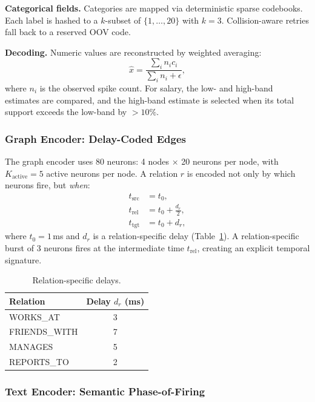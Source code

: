 \textbf{Categorical fields.} Categories are mapped via deterministic sparse codebooks. Each label is hashed to a $k$-subset of $\{1,\dots,20\}$ with $k=3$. Collision-aware retries fall back to a reserved OOV code.

\textbf{Decoding.} Numeric values are reconstructed by weighted averaging:
\begin{equation}
\hat{x} = \frac{\sum_i n_i c_i}{\sum_i n_i + \epsilon},
\end{equation}
where $n_i$ is the observed spike count. For salary, the low- and high-band estimates are compared, and the high-band estimate is selected when its total support exceeds the low-band by $>10\%$.

\subsubsection{Graph Encoder: Delay-Coded Edges}

The graph encoder uses 80 neurons: 4 nodes $\times$ 20 neurons per node, with $K_{\mathrm{active}}=5$ active neurons per node. A relation $r$ is encoded not only by which neurons fire, but \textit{when}:
\begin{align}
t_{\mathrm{src}} &= t_0, \\
t_{\mathrm{rel}} &= t_0 + \frac{d_r}{2}, \\
t_{\mathrm{tgt}} &= t_0 + d_r,
\end{align}
where $t_0 = 1$\,ms and $d_r$ is a relation-specific delay (Table~\ref{tab:delays}). A relation-specific burst of 3 neurons fires at the intermediate time $t_{\mathrm{rel}}$, creating an explicit temporal signature.

\begin{table}[h]
\centering
\caption{Relation-specific delays.}
\label{tab:delays}
\begin{tabular}{@{}lc@{}}
\toprule
\textbf{Relation} & \textbf{Delay $d_r$ (ms)} \\
\midrule
WORKS\_AT & 3 \\
FRIENDS\_WITH & 7 \\
MANAGES & 5 \\
REPORTS\_TO & 2 \\
\bottomrule
\end{tabular}
\end{table}

\subsubsection{Text Encoder: Semantic Phase-of-Firing}

